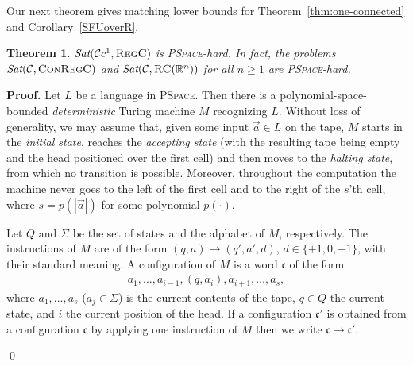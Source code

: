 \documentclass{LMCS}
\renewenvironment{proof}{\par\noindent\textbf{Proof.}}{\mbox{}\qed\par\medskip}
\theoremstyle{plain}
\newtheorem{theorem}[thm]{Theorem}
\newcommand{\cBC}{\ensuremath{\mathcal{C}}}
\newcommand{\cBCc}{\ensuremath{\cBC{}c}} \newcommand{\cBCcc}{\ensuremath{\cBC{}cc}}
\newcommand{\Sat}{\textit{Sat}}
\newcommand{\Regc}{\textsc{RegC}}
\newcommand{\ConR}{\textsc{ConRegC}}
\newcommand{\PSpace}{\textsc{PSpace}}
\begin{document}
Our next theorem gives matching lower bounds for
Theorem~\ref{thm:one-connected} and Corollary~\ref{SFUoverR}.
\begin{theorem}\label{pspace-lower}
$\Sat (\cBCc{}^1,\Regc)$ is \PSpace{}-hard. In fact, the problems
$\Sat (\cBC{},\ConR)$ and $\Sat (\cBC{},\RegC(\R^n))$ for all $n \geq 1$ are \PSpace{}-hard.
\end{theorem}
\begin{proof}
Let $L$ be a language in \PSpace. Then there is a
polynomial-space-bounded \emph{deterministic} Turing machine $M$
recognizing $L$. Without loss of generality, we may assume that, given
some input $\vec{a} \in L$ on the tape, $M$ starts in the \emph{initial
state}, reaches the \emph{accepting state} (with the resulting tape
being empty and the head positioned over the first cell) and then
moves to the \emph{halting state}, from which no transition is
possible. Moreover, throughout the computation the machine never goes
to the left of the first cell and to the right of the $s$'th cell,
where $s = p(|\vec{a}|)$ for some polynomial
$p(\cdot)$.

Let $Q$ and $\Sigma$ be the set of states and the alphabet of $M$,
respectively. The instructions of $M$ are of the form $(q,a)\to
(q',a',d)$, $d \in \{+1,0,-1\}$, with their standard
meaning.
A configuration of $M$ is a word
$\mathfrak{c}$ of the form
\begin{align}\label{config1}
a_1,\dots, a_{i-1}, (q,a_i), a_{i+1}, \dots, a_s,
\end{align}
where $a_1,\dots,a_s$ ($a_j\in \Sigma$) is the current contents of the tape, $q\in Q$ the current state, and $i$ the current position of
the head. If a configuration $\mathfrak c'$ is obtained from a
configuration $\mathfrak c$ by applying one instruction of $M$ then
we write $\mathfrak c \to \mathfrak c'$.


\end{proof}
\end{document}
